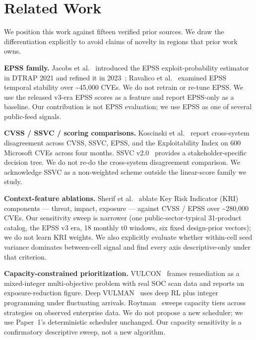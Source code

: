 \section{Related Work}
We position this work against fifteen verified prior sources. We draw the differentiation explicitly to avoid claims of novelty in regions that prior work owns.

\textbf{EPSS family.} Jacobs et al.~\cite{Jacobs2021EPSS} introduced the EPSS exploit-probability estimator in DTRAP 2021 and refined it in 2023~\cite{Jacobs2023EnhancingEPSS}; Ravalico et al.~\cite{Ravalico2025EPSSDynamics} examined EPSS temporal stability over \textasciitilde{}45,000 CVEs. We do not retrain or re-tune EPSS. We use the released v3-era EPSS scores as a feature and report EPSS-only as a baseline. Our contribution is not EPSS evaluation; we use EPSS as one of several public-feed signals.

\textbf{CVSS / SSVC / scoring comparisons.} Koscinski et al.~\cite{Koscinski2025ConflictingScores} report cross-system disagreement across CVSS, SSVC, EPSS, and the Exploitability Index on 600 Microsoft CVEs across four months. SSVC v2.0~\cite{CISA2023SSVCv2} provides a stakeholder-specific decision tree. We do not re-do the cross-system disagreement comparison. We acknowledge SSVC as a non-weighted scheme outside the linear-score family we study.

\textbf{Context-feature ablations.} Sherif et al.~\cite{Sherif2026KRI} ablate Key Risk Indicator (KRI) components --- threat, impact, exposure --- against CVSS / EPSS over \textasciitilde{}280,000 CVEs. Our sensitivity sweep is narrower (one public-sector-typical 31-product catalog, the EPSS v3 era, 18 monthly t0 windows, six fixed design-prior vectors); we do not learn KRI weights. We also explicitly evaluate whether within-cell seed variance dominates between-cell signal and find every axis descriptive-only under that criterion.

\textbf{Capacity-constrained prioritization.} VULCON~\cite{Farris2018VULCON} frames remediation as a mixed-integer multi-objective problem with real SOC scan data and reports an exposure-reduction figure. Deep VULMAN~\cite{Hore2023DeepVulman} uses deep RL plus integer programming under fluctuating arrivals. Roytman~\cite{Roytman2024CapacityIsKing} sweeps capacity tiers across strategies on observed enterprise data. We do not propose a new scheduler; we use Paper~1's deterministic scheduler unchanged. Our capacity sensitivity is a confirmatory descriptive sweep, not a new algorithm.

